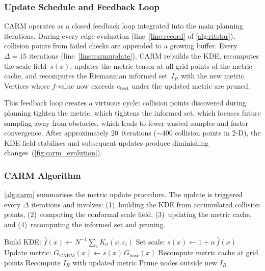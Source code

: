 \documentclass[journal]{IEEEtran}
\newcommand{\IR}{I_{\!R}}
\begin{document}
\subsubsection{Update Schedule and Feedback Loop}

CARM operates as a closed feedback loop integrated into the main
planning iterations.
During every edge evaluation
(line~\ref{line:record} of \cref{alg:ritstar}), collision points
from failed checks are appended to a growing buffer.
Every $\Delta = 15$ iterations
(line~\ref{line:carmupdate}), CARM rebuilds the KDE, recomputes
the scale field~$s(x)$, updates the metric tensor at all grid points
of the metric cache, and recomputes the Riemannian informed
set~$\IR$ with the new metric.
Vertices whose $f$-value now exceeds $c_{\mathrm{best}}$ under the
updated metric are pruned.

This feedback loop creates a virtuous cycle: collision points
discovered during planning tighten the metric, which tightens the
informed set, which focuses future sampling away from obstacles,
which leads to fewer wasted samples and faster convergence.
After approximately 20~iterations (${\sim}400$ collision points in
2-D), the KDE field stabilises and subsequent updates produce
diminishing changes~(\cref{fig:carm_evolution}).

\subsubsection{CARM Algorithm}

\cref{alg:carm} summarises the metric update procedure.
The update is triggered every $\Delta$ iterations and involves:
(1)~building the KDE from accumulated collision points,
(2)~computing the conformal scale field,
(3)~updating the metric cache, and
(4)~recomputing the informed set and pruning.

\begin{algorithm}[t]
\SetAlgoLined
{}
Build KDE: $\hat{f}(x) \gets N^{-1}\sum_{i} K_\sigma(x, c_i)$\;
Set scale: $s(x) \gets 1 + \alpha\, \hat{f}(x)$\;
Update metric: $G_{\mathrm{CARM}}(x) \gets s(x)\, G_{\mathrm{base}}(x)$\;
Recompute metric cache at grid points\;
Recompute $\IR$ with updated metric\;
Prune nodes outside new $\IR$\;
\caption{\textsc{CARM\_Update}$(\{c_i\},\, G_{\mathrm{base}},\, \sigma,\, \alpha) \to G_{\mathrm{CARM}}$}
\label{alg:carm}
\end{algorithm}
\end{document}
